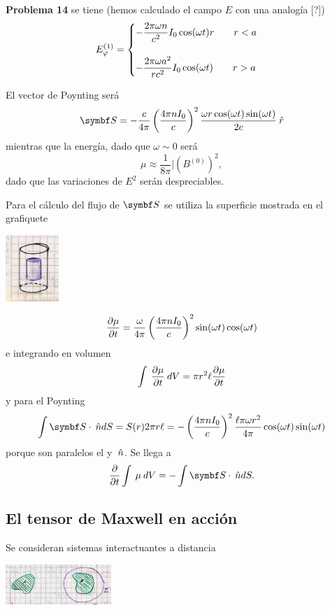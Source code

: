 \documentclass[10pt,oneside]{CBFT_book}
\begin{document}
\begin{ejemplo}{\bf Problema 14}
se tiene (hemos calculado el campo $E$ con una analogía [?])
\[
	E_{\varphi}^{(1)} = \begin{cases}
	 \displaystyle - \frac{2 \pi \omega n}{c^2} I_0 \cos(\omega t) r \qquad r < a  \\
	 \\
	 \displaystyle - \frac{2 \pi \omega a^2}{r c^2} I_0 \cos(\omega t) \qquad r > a
	\end{cases}
\]

El vector de Poynting será
\[
	\vb{S} = - \frac{c}{4\pi}\Frac{ 4 \pi n I_0 }{c }^2 
	\frac{ \omega r \cos( \omega t ) \sin( \omega t ) }{ 2 c } \rver
\]
mientras que la energía, dado que $\omega \sim 0$ será
\[
	\mu \approx \frac{1}{8\pi}|(B^{(0)})^2,
\]
dado que las variaciones de $E^2$ serán despreciables.

Para el cálculo del flujo de $\vb{S}$ se utiliza la superficie mostrada en el grafiquete

\includegraphics[width=0.15\textwidth]{images/fig_ft1_problema14C.jpg}

\[
	\frac{\partial^{\hspace{-0.05em}} {\mu}}{\partial {t}^{\hspace{-0.05em}}} = \frac{\omega}{4\pi} \left( \frac{  4 \pi n I_0  }{ c  } \right)^2
	\sin(\omega t) \cos(\omega t)
\]
e integrando en volumen
\[
	\int \: \frac{\partial^{\hspace{-0.05em}} {\mu}}{\partial {t}^{\hspace{-0.05em}}}  \: dV = \pi r^2 \ell \frac{\partial^{\hspace{-0.05em}} {\mu}}{\partial {t}^{\hspace{-0.05em}}}
\]
y para el Poynting
\[
	\int \vb{S}\cdot \nver dS = S(r) 2\pi r \ell =
	- \Frac{ 4 \pi n I_0 }{c }^2 \frac{\ell \pi \omega r^2}{4\pi} \cos(\omega t)\sin(\omega t)
\]
porque son paralelos el  y $\:\hat{n}$. Se llega a
\[
	\dpar{}{t} \int \: \mu \: dV = - \int \vb{S}\cdot \nver dS.
\]
 
\end{ejemplo}





\subsection{El tensor de Maxwell en acción}

Se consideran sistemas interactuantes a distancia

\includegraphics[width=0.3\textwidth]{images/fig_ft1_PicsMaxwellA.jpg}
\end{document}
